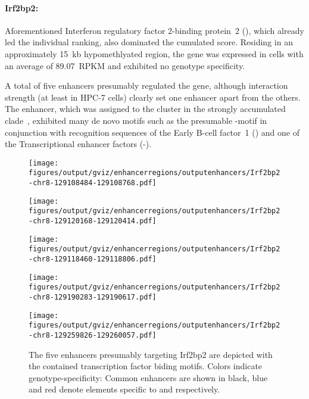 \paragraph{Irf2bp2:} Aforementioned Interferon regulatory factor 2-binding protein~2 (), which  already led the individual ranking, also dominated the cumulated score. Residing in an approximately \SI{15}{\kilo b} hypomethlyated region, the gene was expressed in \kithi cells with an average of \SI{89.07}{RPKM} and exhibited no genotype specificity. 

A total of five enhancers presumably regulated the gene, although interaction strength (at least in HPC-7 cells) clearly set one enhancer apart from the others. The enhancer, which was assigned to the \amitthree cluster in the strongly accumulated clade~, exhibited many de novo motifs such as the presumable -motif \motifmlltwo in conjunction with recognition sequences of the Early B-cell factor~1 ()\cite{Treiber2010} and one of the Transcriptional enhancer factors (-). 

 \begin{figure}[tbh]
 	\begin{minipage}{0.5\textwidth}
 		\texttt{[image: figures/output/gviz/enhancerregions/outputenhancers/Irf2bp2-chr8-129108484-129108768.pdf]} 
 	\end{minipage}
 	\begin{minipage}{0.5\textwidth}
 		\texttt{[image: figures/output/gviz/enhancerregions/outputenhancers/Irf2bp2-chr8-129120168-129120414.pdf]} 
 	\end{minipage}
 	\begin{minipage}{\textwidth}
 		\centering
 		\texttt{[image: figures/output/gviz/enhancerregions/outputenhancers/Irf2bp2-chr8-129118460-129118806.pdf]}
 	\end{minipage}
 	\begin{minipage}{0.5\textwidth}
 		\texttt{[image: figures/output/gviz/enhancerregions/outputenhancers/Irf2bp2-chr8-129190283-129190617.pdf]} 
 	\end{minipage}
 	\begin{minipage}{0.5\textwidth}
 		\texttt{[image: figures/output/gviz/enhancerregions/outputenhancers/Irf2bp2-chr8-129259826-129260057.pdf]} 
 	\end{minipage}
 	\caption{The five enhancers presumably targeting Irf2bp2 are depicted with the contained transcription factor biding motifs. Colors indicate genotype-specificity: Common enhancers are shown in black, blue and red denote elements specific to \dnmtwt and \dnmtchip respectively.}
 	\label{fig:enhancers:Irf2bp:enh}
 \end{figure}
 

